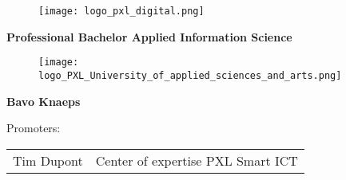 \begin{titlepage}
  \color{pxlgreen}
    \begin{figure}
      \centering
      \texttt{[image: logo\_pxl\_digital.png]}
    \end{figure}
  \vspace{\baselineskip}
    \begin{center}
      \LARGE\textbf{\textcolor{pxlgreen}{Professional Bachelor Applied Information Science}}
    \end{center}
  \vspace{\baselineskip}
    \begin{figure}[h]
      \centering
      \texttt{[image: logo\_PXL\_University\_of\_applied\_sciences\_and\_arts.png]}
    \end{figure}
    \begin{center}
    \end{center}
  \vspace{\baselineskip}
    \begin{center}
      \Large\textbf{\textcolor{pxlgreen}{Bavo Knaeps}}
    \end{center}
    \begin{center}
      \large\textcolor{pxlgreen}{Promoters:}
    \end{center}
    \begin{tabularx}{\textwidth}{C C}
      Tim Dupont & Center of expertise PXL Smart ICT\\
    \end{tabularx}
\end{titlepage}